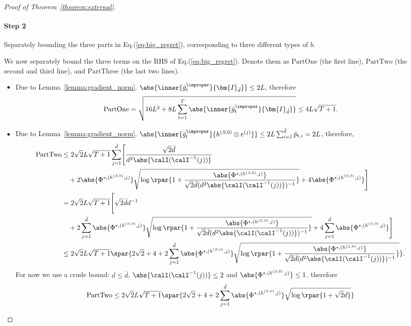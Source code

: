 \documentclass[10pt]{article}
\begin{document}
\begin{proof}[Proof of Theorem~\ref{theorem:external}]
\paragraph{Step 2} Separately bounding the three parts in Eq.(\ref{eq:big_regret}), corresponding to three different types of $b$. 

We now separately bound the three terms on the RHS of Eq.(\ref{eq:big_regret}). Denote them as $\mathrm{PartOne}$ (the first line), $\mathrm{PartTwo}$ (the second and third line), and $\mathrm{PartThree}$ (the last two lines). 
\begin{itemize}
\item Due to Lemma~\ref{lemma:gradient_norm}, $\abs{\inner{\bar g_t^\improper}{\bm{I}_{\bar d}}}\leq 2L$, therefore
\begin{equation*}
\mathrm{PartOne}=\sqrt{16L^2+8L\sum_{t=1}^T\abs{\inner{\bar g_t^\improper}{\bm{I}_{\bar d}}}}\leq 4L\sqrt{T+1}.
\end{equation*}
\item Due to Lemma~\ref{lemma:gradient_norm}, $\abs{\inner{\bar g_t^\improper}{h^{(S,0)}\otimes e^{(j)}}}\leq 2L\sum_{i=1}^{\bar d}\bar p_{t,i}=2L$, therefore,
\begin{align}
\mathrm{PartTwo}
&\leq 2\sqrt{2}L\sqrt{T+1}\sum_{j=1}^{\bar d}\Biggl[\frac{\sqrt{2}\bar d}{d^2\abs{\calI(\calI^{-1}(j))}}\nonumber\\
&\quad+2\abs{\Phi^{*,(h^{(S,0)},j)}}\sqrt{\log\rpar{1+\frac{\abs{\Phi^{*,(h^{(S,0)},j)}}}{\sqrt{2}\bar d(d^2\abs{\calI(\calI^{-1}(j))})^{-1}}}}+4\abs{\Phi^{*,(h^{(S,0)},j)}}\Biggr]\nonumber\\
&= 2\sqrt{2}L\sqrt{T+1}\Bigg[\sqrt{2}\bar d d^{-1}\nonumber\\
&\quad+2\sum_{j=1}^{\bar d}\abs{\Phi^{*,(h^{(S,0)},j)}}\sqrt{\log\rpar{1+\frac{\abs{\Phi^{*,(h^{(S,0)},j)}}}{\sqrt{2}\bar d(d^2\abs{\calI(\calI^{-1}(j))})^{-1}}}}+4\sum_{j=1}^{\bar d}\abs{\Phi^{*,(h^{(S,0)},j)}}\Bigg]\nonumber\\
&\leq 2\sqrt{2}L\sqrt{T+1}\spar{2\sqrt{2}+4+2\sum_{j=1}^{\bar d}\abs{\Phi^{*,(h^{(S,0)},j)}}\sqrt{\log\rpar{1+\frac{\abs{\Phi^{*,(h^{(S,0)},j)}}}{\sqrt{2}\bar d(d^2\abs{\calI(\calI^{-1}(j))})^{-1}}}}}.\label{eq:termtwo}
\end{align}
For now we use a crude bound: $d\leq \bar d$, $\abs{\calI(\calI^{-1}(j))}\leq 2$ and $\abs{\Phi^{*,(h^{(S,0)},j)}}\leq 1$, therefore
\begin{align*}
\mathrm{PartTwo}&\leq 2\sqrt{2}L\sqrt{T+1}\spar{2\sqrt{2}+4+2\sum_{j=1}^{\bar d}\abs{\Phi^{*,(h^{(S,0)},j)}}\sqrt{\log\rpar{1+\sqrt{2}d}}}\\

\end{align*}
\end{itemize}
\end{proof}
\end{document}
